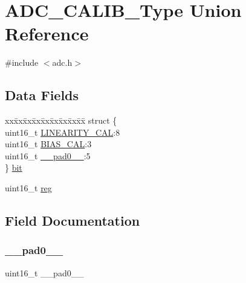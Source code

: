 \hypertarget{union_a_d_c___c_a_l_i_b___type}{}\section{A\+D\+C\+\_\+\+C\+A\+L\+I\+B\+\_\+\+Type Union Reference}
\label{union_a_d_c___c_a_l_i_b___type}


{\ttfamily \#include $<$adc.\+h$>$}

\subsection*{Data Fields}
\begin{DoxyCompactItemize}
\item 
\begin{tabbing}
xx\=xx\=xx\=xx\=xx\=xx\=xx\=xx\=xx\=\kill
struct \{\\
\>uint16\_t \mbox{\hyperlink{union_a_d_c___c_a_l_i_b___type_ad6f9c4e46b6d87e2a269d57c28f9da2b}{LINEARITY\_CAL}}:8\\
\>uint16\_t \mbox{\hyperlink{union_a_d_c___c_a_l_i_b___type_a710bb4b0c041ddab2537978bef1b668e}{BIAS\_CAL}}:3\\
\>uint16\_t \mbox{\hyperlink{union_a_d_c___c_a_l_i_b___type_a77132c2c26a75f5b8751b235cda23828}{\_\_pad0\_\_}}:5\\
\} \mbox{\hyperlink{union_a_d_c___c_a_l_i_b___type_ab4f6c0d9754d1c7f29463e1c221e8ea9}{bit}}\\

\end{tabbing}\item 
uint16\+\_\+t \mbox{\hyperlink{union_a_d_c___c_a_l_i_b___type_a11760f5020019f4aa8cb02e694f7cc44}{reg}}
\end{DoxyCompactItemize}


\subsection{Field Documentation}
\mbox{\label{union_a_d_c___c_a_l_i_b___type_a77132c2c26a75f5b8751b235cda23828}} 
\subsubsection{\texorpdfstring{\_\_pad0\_\_}{\_\_pad0\_\_}}
{\footnotesize\ttfamily uint16\+\_\+t \+\_\+\+\_\+pad0\+\_\+\+\_\+}

